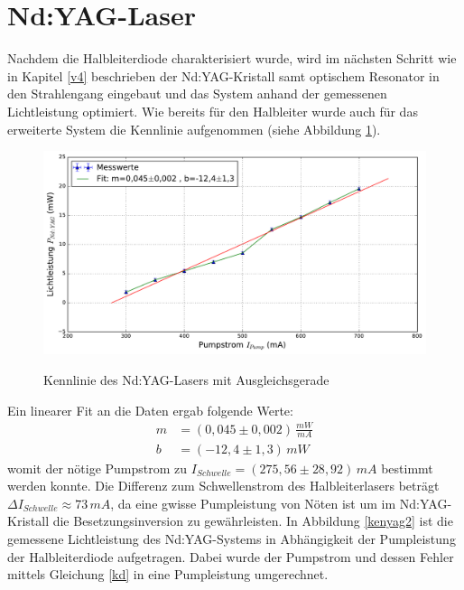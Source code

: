 \documentclass[twoside,colorback,accentcolor=tud4c,11pt]{tudreport}
\begin{document}
\section{Nd:YAG-Laser}
Nachdem die Halbleiterdiode charakterisiert wurde, wird im nächsten Schritt wie in Kapitel \ref{v4} beschrieben der Nd:YAG-Kristall samt optischem Resonator in den Strahlengang eingebaut und das System anhand der gemessenen Lichtleistung optimiert. Wie bereits für den Halbleiter wurde auch für das erweiterte System die Kennlinie aufgenommen (siehe Abbildung \ref{kenyag}).

\begin{figure}[H]
\centering
   	\begin{minipage}[b]{0.85\textwidth}
   	\includegraphics[width=\textwidth]{graphics/kenn_ndyag_PS.pdf}
  	\label{kenyag}
   	\end{minipage}
\caption{Kennlinie des Nd:YAG-Lasers mit Ausgleichsgerade}	
\end{figure}
Ein linearer Fit an die Daten ergab folgende Werte:
\begin{align}
m&= (0,045\pm 0,002)\,\si{\frac{mW}{mA}}\\
b&= (-12,4\pm 1,3)\,\si{mW}
\end{align}
womit der nötige Pumpstrom zu $I_{Schwelle}=(275,56\pm 28,92)\,\si{mA}$ bestimmt werden konnte. Die Differenz zum Schwellenstrom des Halbleiterlasers beträgt $\Delta I_{Schwelle}\approx 73\,\si{mA}$, da eine gwisse Pumpleistung von Nöten ist um im Nd:YAG-Kristall die Besetzungsinversion zu gewährleisten. In Abbildung \ref{kenyag2} ist die gemessene Lichtleistung des Nd:YAG-Systems in Abhängigkeit der Pumpleistung der Halbleiterdiode aufgetragen. Dabei wurde der Pumpstrom und dessen Fehler mittels Gleichung \ref{kd} in eine Pumpleistung umgerechnet.
\end{document}

